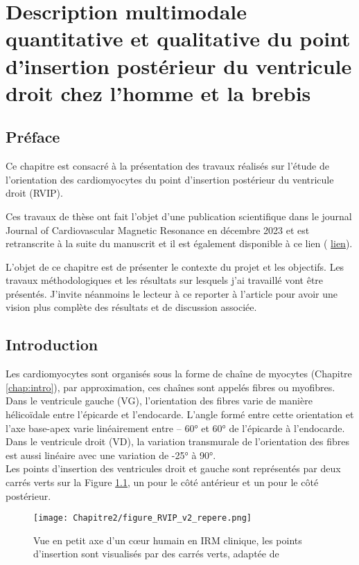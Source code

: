 \chapter{Description multimodale quantitative et qualitative du point d’insertion postérieur du ventricule droit chez l’homme et la brebis}
\label{chap:RVIP}

\minitoc
\section{Préface}

Ce chapitre est consacré à la présentation des travaux réalisés sur l’étude de l’orientation des cardiomyocytes du point d’insertion postérieur du ventricule droit (RVIP).

Ces travaux de thèse ont fait l’objet d’une publication scientifique dans le journal Journal of Cardiovascular Magnetic Resonance en décembre 2023 et est retranscrite à la suite du manuscrit et il est également disponible à ce lien ( \href{https://doi.org/10.1186/s12968-023-00989-y}{lien}). 

L’objet de ce chapitre est de présenter le contexte du projet et les objectifs. Les travaux méthodologiques et les résultats sur lesquels j’ai travaillé vont être présentés. J’invite néanmoins le lecteur à ce reporter à l’article pour avoir une vision plus complète des résultats et de discussion associée. 
 \section{Introduction}
 
 Les cardiomyocytes sont organisés sous la forme de chaîne de myocytes (Chapitre \ref{chap:intro}), par approximation, ces chaînes sont appelés fibres ou myofibres. Dans le ventricule gauche (VG), l’orientation des fibres varie de manière hélicoïdale entre l’épicarde et l’endocarde. L’angle formé entre cette orientation et l’axe base-apex varie linéairement entre – 60° et 60° de l’épicarde à l’endocarde. Dans le ventricule droit (VD), la variation transmurale de l’orientation des fibres est aussi linéaire avec une variation de -25° à 90°. 
\\
Les points d’insertion des ventricules droit et gauche sont représentés par deux carrés verts sur la Figure \ref{fig:repere_RVIP}, un pour le côté antérieur et un pour le côté postérieur. 

\begin{figure}[!ht]
  \begin{center}
    \texttt{[image: Chapitre2/figure\_RVIP\_v2\_repere.png]}
  \end{center}
  \caption{Vue en petit axe d’un cœur humain en IRM clinique, les points d’insertion sont visualisés par des carrés verts, adaptée de \cite{Li2020}}
  \label{fig:repere_RVIP}
\end{figure}

